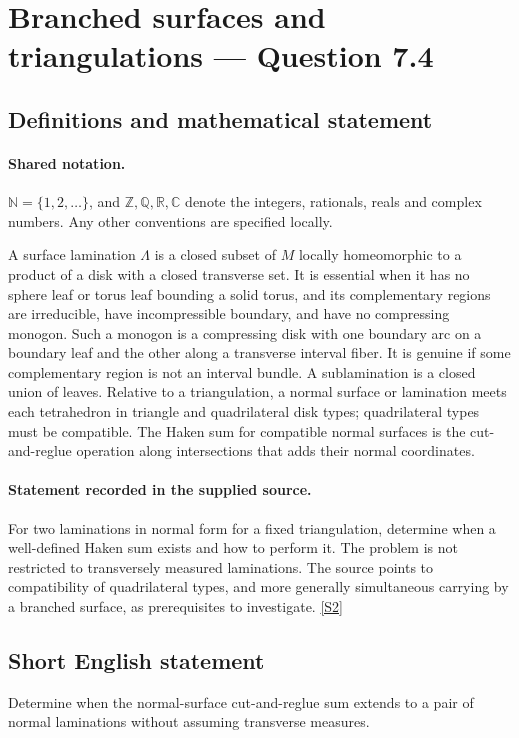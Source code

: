 \documentclass[11pt]{article}
\newcommand{\sref}[2]{\hyperlink{source:#1:#2}{[S#2]}}
\begin{document}
\section{Branched surfaces and triangulations — Question 7.4}\label{statement}

\subsection{Definitions and mathematical statement}

\paragraph{Shared notation.}$\mathbb N=\{1,2,\ldots\}$, and $\mathbb Z,\mathbb Q,\mathbb R,\mathbb C$ denote the integers, rationals, reals and complex numbers. Any other conventions are specified locally.


A surface lamination $\Lambda$ is a closed subset of $M$ locally homeomorphic to a product of a disk with a closed transverse set. It is essential when it has no sphere leaf or torus leaf bounding a solid torus, and its complementary regions are irreducible, have incompressible boundary, and have no compressing monogon. Such a monogon is a compressing disk with one boundary arc on a boundary leaf and the other along a transverse interval fiber. It is genuine if some complementary region is not an interval bundle. A sublamination is a closed union of leaves. Relative to a triangulation, a normal surface or lamination meets each tetrahedron in triangle and quadrilateral disk types; quadrilateral types must be compatible. The Haken sum for compatible normal surfaces is the cut-and-reglue operation along intersections that adds their normal coordinates.
\paragraph{Statement recorded in the supplied source.}
For two laminations in normal form for a fixed triangulation, determine when a well-defined Haken sum exists and how to perform it. The problem is not restricted to transversely measured laminations. The source points to compatibility of quadrilateral types, and more generally simultaneous carrying by a branched surface, as prerequisites to investigate. \sref{statement}{2}
\subsection{Short English statement}
Determine when the normal-surface cut-and-reglue sum extends to a pair of normal laminations without assuming transverse measures.
\end{document}
